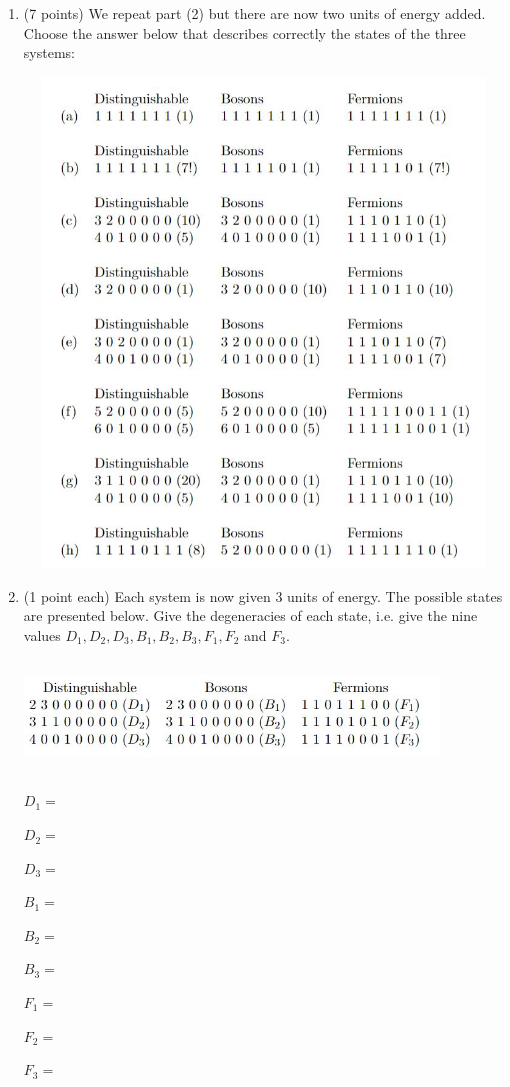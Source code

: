 \documentclass[fleqn]{article}
\begin{document}
\begin{enumerate}
    \item (7 points) We repeat part (2) but there are now two units of energy added. Choose the answer
    below that describes correctly the states of the three systems:
    \begin{center}
      \includegraphics[height=13cm, width=16cm]{3.JPG}
    \end{center}

    \pagebreak

    \item (1 point each) Each system is now given $3$ units of energy. The possible states are presented
    below. Give the degeneracies of each state, i.e. give the nine values $D_1, D_2, D_3, B_1, B_2, B_3,
    F_1, F_2$ and $F_3$.
    \begin{center}
      \includegraphics[height=3cm, width=11cm]{4.JPG}
    \end{center}

    $
      D_1=
    $

    $
      D_2=
    $

    $
      D_3=
    $

    $
      B_1=
    $

    $
      B_2=
    $

    $
      B_3=
    $

    $
      F_1=
    $

    $
      F_2=
    $

    $
      F_3=
    $
    
  \end{enumerate}
\end{document}
